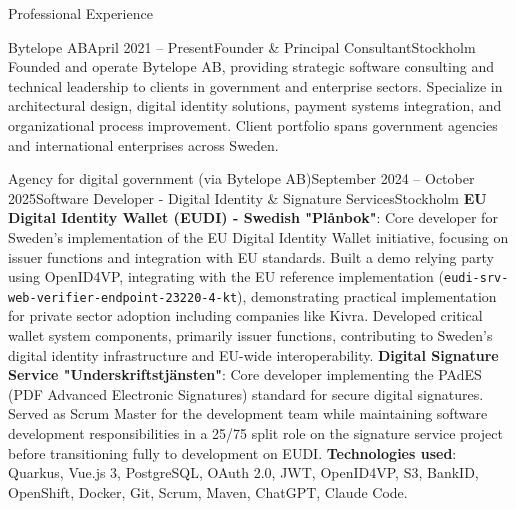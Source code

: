 \documentclass{resume}
\begin{document}
\begin{rSection}{Professional Experience}

\begin{rSubsection}{Bytelope AB}{April 2021 -- Present}{Founder \& Principal Consultant}{Stockholm}
\bItem Founded and operate Bytelope AB, providing strategic software consulting and technical leadership to clients in government and enterprise sectors.
\bItem Specialize in architectural design, digital identity solutions, payment systems integration, and organizational process improvement.
\bItem Client portfolio spans government agencies and international enterprises across Sweden.
\end{rSubsection}

\begin{rClientSubsection}{Agency for digital government (via Bytelope AB)}{September 2024 -- October 2025}{Software Developer - Digital Identity \& Signature Services}{Stockholm} %
\bItem \textbf{EU Digital Identity Wallet (EUDI) - Swedish "Plånbok"}: Core developer for Sweden's implementation of the EU Digital Identity Wallet initiative, focusing on issuer functions and integration with EU standards.
\bItem Built a demo relying party using OpenID4VP, integrating with the EU reference implementation (\texttt{eudi-srv-web-verifier-endpoint-23220-4-kt}), demonstrating practical implementation for private sector adoption including companies like Kivra.
\bItem Developed critical wallet system components, primarily issuer functions, contributing to Sweden's digital identity infrastructure and EU-wide interoperability.
\bItem \textbf{Digital Signature Service "Underskriftstjänsten"}: Core developer implementing the PAdES (PDF Advanced Electronic Signatures) standard for secure digital signatures.
\bItem Served as Scrum Master for the development team while maintaining software development responsibilities in a 25/75 split role on the signature service project before transitioning fully to development on EUDI.
\bItem \textbf{Technologies used}: Quarkus, Vue.js 3, PostgreSQL, OAuth 2.0, JWT, OpenID4VP, S3, BankID, OpenShift, Docker, Git, Scrum, Maven, ChatGPT, Claude Code.
\end{rClientSubsection}


\end{rSection}
\end{document}
